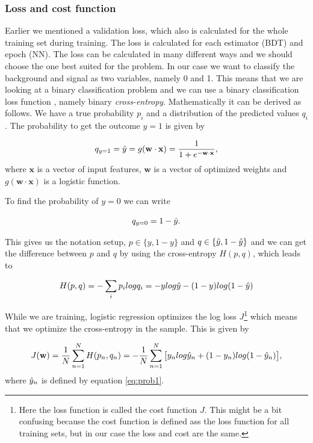 \subsubsection{Loss and cost function}
Earlier we mentioned a validation loss, which also is calculated for the whole training set during training. The loss is calculated for each estimator (BDT) and epoch (NN). The loss can be calculated in many different ways and we should choose the one best suited for the problem. In our case we want to classify the background and signal as two variables, namely 0 and 1. This means that we are looking at a binary classification problem and we can use a binary classification loss function \cite{Loss}, namely binary \textit{cross-entropy}. Mathematically it can be derived as follows. We have a true probability $p_i$ and a distribution of the predicted values $q_i$. The probability to get the outcome $y=1$ is given by

\begin{equation}
    \label{eq:prob1}
    q_{y=1} = \Hat{y} = g(\textbf{w} \cdot \textbf{x}) = \frac{1}{1+e^{-\textbf{w} \cdot \textbf{x}}},
\end{equation}
where $\textbf{x}$ is a vector of input features, $\textbf{w}$ is a vector of optimized weights and $g(\textbf{w} \cdot \textbf{x})$ is a logistic function.

To find the probability of $y=0$ we can write

\begin{equation}
    \label{eq:prob0}
    q_{y=0} = 1- \Hat{y}.
\end{equation}

This gives us the notation setup, $p \in \{y, 1-y\}$ and $q \in \{\Hat{y}, 1-\Hat{y}\}$ and we can get the difference between $p$ and $q$ by using the cross-entropy $H(p,q)$, which leads to

\begin{equation}
    \label{eq:crossentropy}
    H(p,q) = - \sum_i p_i log q_i = - y log \Hat{y} - (1-y) log(1-\Hat{y})
\end{equation}

While we are training, logistic regression optimizes the log loss $J$\footnote{Here the loss function is called the cost function $J$. This might be a bit confusing because the cost function is defined ass the loss function for all training sets, but in our case the loss and cost are the same.} which means that we optimize the cross-entropy in the sample. This is given by

\begin{equation}
    \label{eq:loss}
    J(\textbf{w}) = \frac{1}{N} \sum_{n=1}^N H(p_n, q_n) = - \frac{1}{N} \sum_{n=1}^N \big[y_n log \Hat{y}_n + (1-y_n) log(1-\Hat{y}_n)\big],
\end{equation}
where $\Hat{y}_n$ is defined by equation \ref{eq:prob1}.

